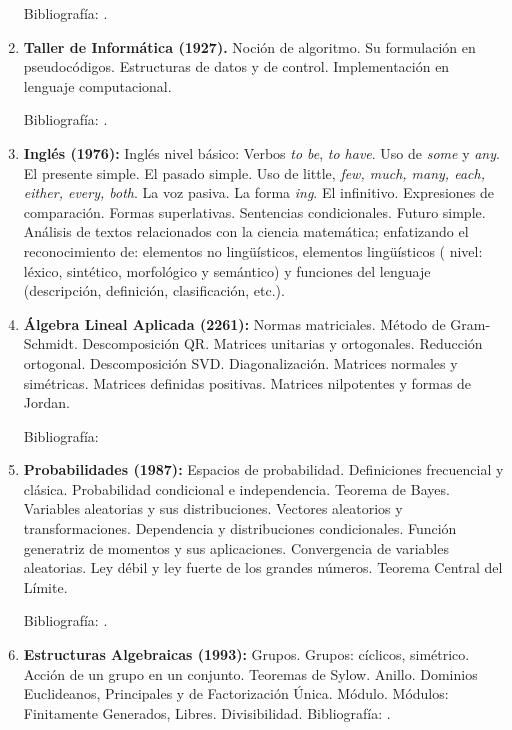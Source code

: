 \documentclass[a4paper, 12pt]{article}
\begin{document}
\begin{enumerate}
Bibliografía: \cite{ marsdentromba,MarianoGiaquinta641,ErnstHairer633,PeterD.Lax632,thomas2006c}.


\item \textbf{Taller de Informática (1927).} Noción de algoritmo. Su formulación en pseudocódigos. Estructuras de datos y de control. Implementación
en lenguaje computacional.

Bibliografía: \cite{Seroul:2000,Rose:2015}.









\item\textbf{Inglés (1976):} Inglés nivel básico: Verbos \emph{to be}, \emph{to
have}. Uso de \emph{some} y \emph{any}. El presente simple. El
pasado simple. Uso de little, \emph{few, much, many, each, either,
every, both}. La voz pasiva. La forma \emph{ing}. El infinitivo.
Expresiones de comparación. Formas superlativas. Sentencias
condicionales. Futuro simple.  Análisis de textos relacionados con la
ciencia matemática; enfatizando el reconocimiento de: elementos no
ling\"{u}ísticos, elementos ling\"{u}ísticos ( nivel: léxico,
sintético, morfológico y semántico) y funciones del lenguaje
(descripción, definición, clasificación, etc.).


\item\textbf{Álgebra Lineal Aplicada (2261):}  Normas matriciales.
Método de Gram-Schmidt. Descomposición QR.
Matrices unitarias y ortogonales. Reducción ortogonal.
Descomposición SVD. Diagonalización. Matrices normales y simétricas. Matrices
definidas positivas. Matrices nilpotentes y formas de Jordan.

 Bibliografía: \cite{golub,hoffman,meyer, strang}


\item \textbf{Probabilidades (1987):} Espacios de probabilidad. Definiciones frecuencial y clásica.   Probabilidad condicional e independencia.  Teorema de Bayes. Variables aleatorias y sus distribuciones.  Vectores aleatorios y transformaciones.  Dependencia y distribuciones condicionales. Función generatriz de momentos y sus aplicaciones. Convergencia de variables aleatorias. Ley débil y ley fuerte de los grandes números. Teorema Central del Límite. 

Bibliografía: \cite{berts, parzen, ross, grimmet, menden}. 

\item \textbf{Estructuras Algebraicas  (1993):} 
Grupos. Grupos: cíclicos, simétrico. Acción de un grupo en un conjunto. Teoremas de Sylow. Anillo. Dominios Euclideanos, Principales y de Factorización Única. Módulo. Módulos: Finitamente Generados, Libres. Divisibilidad.
Bibliografía: \cite{ gentile,herstein, lang}.





\end{enumerate}
\end{document}
